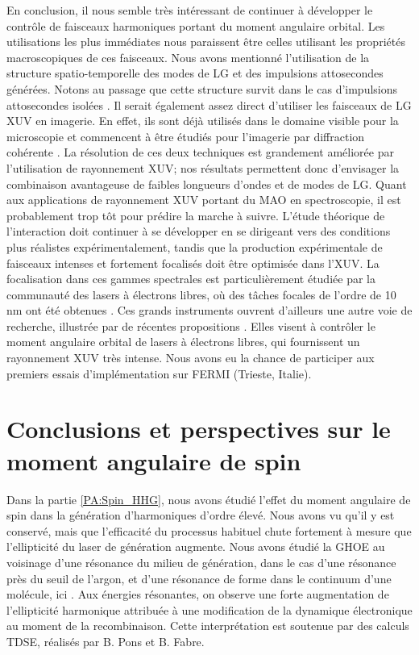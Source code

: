 En conclusion, il nous semble très intéressant de continuer à développer le contrôle de faisceaux harmoniques portant du moment angulaire orbital. Les utilisations les plus immédiates nous paraissent être celles utilisant les propriétés macroscopiques de ces faisceaux. Nous avons mentionné l'utilisation de la structure spatio-temporelle des modes de LG et des impulsions attosecondes générées. Notons au passage que cette structure survit dans le cas d'impulsions attosecondes isolées . Il serait également assez direct d'utiliser les faisceaux de LG XUV en imagerie. En effet, ils sont déjà utilisés dans le domaine visible pour la microscopie  et commencent à être étudiés pour l'imagerie par diffraction cohérente . La résolution de ces deux techniques est grandement améliorée par l'utilisation de rayonnement XUV; nos résultats permettent donc d'envisager la combinaison avantageuse de faibles longueurs d'ondes et de modes de LG. \linebreak
Quant aux applications de rayonnement XUV portant du MAO en spectroscopie, il est probablement trop tôt pour prédire la marche à suivre. L'étude théorique de l'interaction doit continuer à se développer en se dirigeant vers des conditions plus réalistes expérimentalement, tandis que la production expérimentale de faisceaux intenses et fortement focalisés doit être optimisée dans l'XUV. La focalisation dans ces gammes spectrales est particulièrement étudiée par la communauté des lasers à électrons libres, où des tâches focales de l'ordre de 10 nm ont été obtenues . Ces grands instruments ouvrent d'ailleurs une autre voie de recherche, illustrée par de récentes propositions . Elles visent à contrôler le moment angulaire orbital de lasers à électrons libres, qui fournissent un rayonnement XUV très intense. Nous avons eu la chance de participer aux premiers essais d'implémentation sur FERMI (Trieste, Italie).

\section{Conclusions et perspectives sur le moment angulaire de spin}
Dans la partie \ref{PA:Spin_HHG}, nous avons étudié l'effet du moment angulaire de spin dans la génération d'harmoniques d'ordre élevé. Nous avons vu qu'il y est conservé, mais que l'efficacité du processus habituel chute fortement à mesure que l'ellipticité du laser de génération augmente. Nous avons étudié la GHOE au voisinage d'une résonance du milieu de génération, dans le cas d'une résonance près du seuil de l'argon, et d'une résonance de forme dans le continuum d'une molécule, ici . Aux énergies résonantes, on observe une forte augmentation de l'ellipticité harmonique attribuée à une modification de la dynamique électronique au moment de la recombinaison. Cette interprétation est soutenue par des calculs TDSE, réalisés par B. Pons et B. Fabre. 

